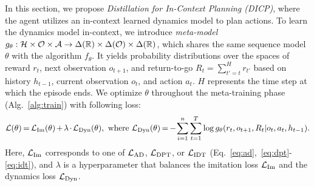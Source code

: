 \documentclass{article}
\begin{document}
In this section, we propose \emph{Distillation for In-Context Planning (DICP)}, where the agent utilizes an in-context learned dynamics model to plan actions.
To learn the dynamics model in-context, we introduce \emph{meta-model} $g_\theta: {\mathcal{H}} \times {\mathcal{O}} \times {\mathcal{A}} \rightarrow \Delta({\mathbb{R}}) \times \Delta({\mathcal{O}}) \times \Delta({\mathbb{R}})$, which shares the same sequence model $\theta$ with the algorithm $f_\theta$.
It yields probability distributions over the spaces of reward $r_t$, next observation $o_{t+1}$, and return-to-go $R_t = \sum_{t'=t}^H r_{t'}$ based on history $h_{t-1}$, current observation $o_t$, and action $a_t$.
$H$ represents the time step at which the episode ends.
We optimize $\theta$ throughout the meta-training phase (Alg.~\ref{alg:train}) with following loss:
\begin{align}
    {\mathcal{L}}(\theta) \hspace{-1pt}=\hspace{-1pt} {\mathcal{L}}_{\textrm{Im}}(\theta) \hspace{-1pt}+\hspace{-1pt} \lambda \hspace{-1pt} \cdot \hspace{-1pt} {\mathcal{L}}_{\textrm{Dyn}}(\theta),\text{ where } {\mathcal{L}}_{\textrm{Dyn}}(\theta) \hspace{-1pt}=\hspace{-1pt} - \hspace{-1pt}\sum_{i=1}^n \sum_{t=1}^{T}  \log g_\theta(r_t, o_{t+1}, R_t | o_t, a_t, h_{t-1}).
    \label{eq:final}
\end{align}
Here, ${\mathcal{L}}_\textrm{Im}$ corresponds to one of ${\mathcal{L}}_{\textrm{AD}}$, ${\mathcal{L}}_{\textrm{DPT}}$, or ${\mathcal{L}}_{\textrm{IDT}}$ (Eq.~\ref{eq:ad},~\ref{eq:dpt}-\ref{eq:idt}), and $\lambda$ is a hyperparameter that balances the imitation loss ${\mathcal{L}}_{\textrm{Im}}$ and the dynamics loss ${\mathcal{L}}_{\textrm{Dyn}}$.

\raggedbottom
\end{document}
